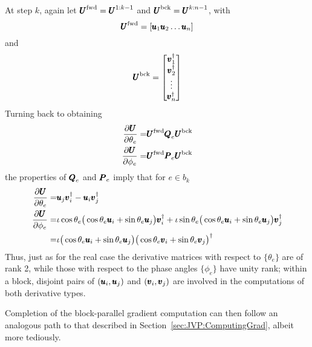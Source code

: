 \documentclass[superscriptaddress,floatfix]{article}
\begin{document}
\begin{appendices}
At step $k$, again let ${\pmb{U}}^{\textrm{fwd}} = {\pmb{U}}^{1:k-1}$ and ${\pmb{U}}^{\textrm{bck}} = {\pmb{U}}^{k:n-1}$, with
\[
  {\pmb{U}}^{\textrm{fwd}} = [{\pmb{u}}_1 {\pmb{u}}_2 \ldots {\pmb{u}}_n]
\]
and
\[
  {\pmb{U}}^{\textrm{bck}} = \begin{bmatrix}
    {\pmb{v}}^\dagger_1 \\
    {\pmb{v}}^\dagger_2 \\
    \vdots \\
    {\pmb{v}}^\dagger_n
\end{bmatrix}
\]
Turning back to obtaining
\begin{align}
  \frac{\partial{\pmb{U}}}{\partial\theta_e} = & {\pmb{U}}^{\textrm{fwd}} {\pmb{Q}}_e {\pmb{U}}^{\textrm{bck}} \nonumber \\
  \frac{\partial{\pmb{U}}}{\partial\phi_e} = & {\pmb{U}}^{\textrm{fwd}} {\pmb{P}}_e {\pmb{U}}^{\textrm{bck}}
\end{align}
the properties of ${\pmb{Q}}_e$ and ${\pmb{P}}_e$ imply that for $e \in b_k$
\begin{align}
  \frac{\partial{\pmb{U}}}{\partial\theta_e} = & {\pmb{u}}_j{\pmb{v}}_i^\dagger - {\pmb{u}}_i{\pmb{v}}_j^\dagger \nonumber \\
  \frac{\partial{\pmb{U}}}{\partial\phi_e} = & \iota\cos \theta_e\big( \cos\theta_e {\pmb{u}}_i + \sin\theta_e {\pmb{u}}_j \big) {\pmb{v}}_i^\dagger + \iota\sin \theta_e\big( \cos\theta_e {\pmb{u}}_i + \sin\theta_e {\pmb{u}}_j \big) {\pmb{v}}_j^\dagger \nonumber \\
  = & \iota \big( \cos\theta_e {\pmb{u}}_i + \sin\theta_e {\pmb{u}}_j \big) \big( \cos\theta_e {\pmb{v}}_i + \sin\theta_e {\pmb{v}}_j \big)^\dagger
\end{align}
Thus, just as for the real case the derivative matrices with respect
to $\{\theta_e\}$ are of rank 2, while those with respect to the phase
angles $\{\phi_e\}$ have unity rank; within a block, disjoint pairs of
$({\pmb{u}}_i, {\pmb{u}}_j)$ and $({\pmb{v}}_i,{\pmb{v}}_j)$ are involved in the computations
of both derivative types.

Completion of the block-parallel gradient computation can then follow
an analogous path to that described in
Section~\ref{sec:JVP:ComputingGrad}, albeit more tediously.

\end{appendices}
\end{document}
